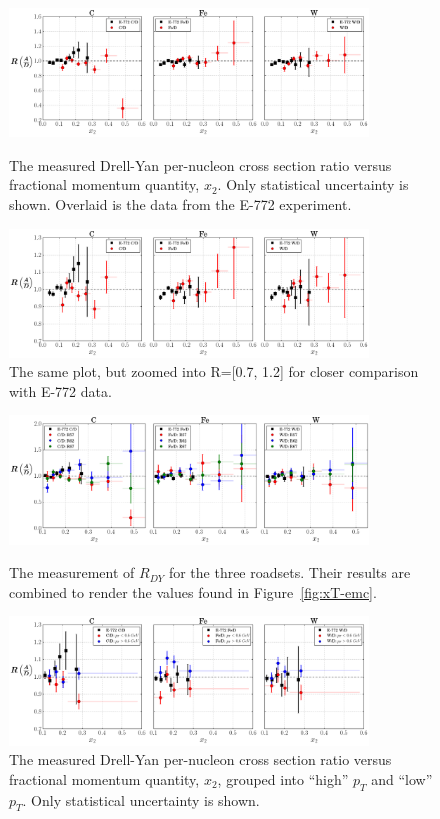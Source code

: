 \begin{figure}
	\centering
	\includegraphics[width=0.85\textwidth]{figures/results/xT-emc.png}
	\caption{The measured Drell-Yan per-nucleon cross section ratio versus fractional momentum quantity, $x_2$. Only statistical uncertainty is shown. Overlaid is the data from the E-772 experiment.}
	\label{fig:xT-emc}
	\vspace{1cm}
	\includegraphics[width=0.85\textwidth]{figures/results/xT-emc-zoom.png}
	\caption{The same plot, but zoomed into R=[0.7, 1.2] for closer comparison with E-772 data.}
	\label{fig:xT-emc-zoomed}
\end{figure}

\begin{figure}
	\centering
	\includegraphics[width=0.85\textwidth]{figures/results/xT-emc-roadset.png}
	\caption{The measurement of $R_{DY}$ for the three roadsets. Their results are combined to render the values found in Figure~\ref{fig:xT-emc}.}
	\label{fig:emc-roadset}
	\vspace{1cm}
	\includegraphics[width=0.85\textwidth]{figures/results/xT-emc-pT.png}
	\caption{The measured Drell-Yan per-nucleon cross section ratio versus fractional momentum quantity, $x_2$, grouped into ``high'' $p_T$ and ``low'' $p_T$. Only statistical uncertainty is shown.}
	\label{fig:xt-pt-emc}
\end{figure}

